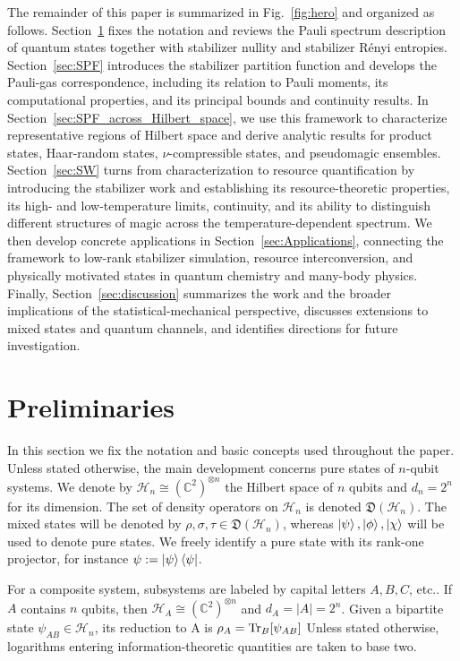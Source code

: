 \documentclass[aps,pra,superscriptaddress,twocolumn,longbibliography]{revtex4-2}
\newcommand{\tr}{{\rm Tr}}
\def\mH{\mathcal{H}}
\def\md{\mathfrak{D}}
\begin{document}
The remainder of this paper is summarized in Fig.~\ref{fig:hero} and organized as follows. 
Section~\ref{sec:preliminaries} fixes the notation and reviews the Pauli spectrum description of quantum states together with stabilizer nullity and stabilizer R\'enyi entropies. 
Section~\ref{sec:SPF} introduces the stabilizer partition function and develops the Pauli-gas correspondence, including its relation to Pauli moments, its computational properties, and its principal bounds and continuity results. 
In Section~\ref{sec:SPF_across_Hilbert_space}, we use this framework to characterize representative regions of Hilbert space and derive analytic results for product states, Haar-random states, $\nu$-compressible states, and pseudomagic ensembles. 
Section~\ref{sec:SW} turns from characterization to resource quantification by introducing the stabilizer work and establishing its resource-theoretic properties, its high- and low-temperature limits, continuity, and its ability to distinguish different structures of magic
across the temperature-dependent spectrum.
We then develop concrete applications in Section~\ref{sec:Applications}, connecting the framework to low-rank stabilizer simulation, resource interconversion, and physically motivated states in quantum chemistry and many-body physics. 
Finally, Section~\ref{sec:discussion} summarizes the work and the broader implications of the statistical-mechanical perspective, discusses extensions to mixed states and quantum channels, and identifies directions for future investigation.

\section{Preliminaries}\label{sec:preliminaries}

In this section we fix the notation and basic concepts used throughout the paper.
Unless stated otherwise, the main development concerns pure states of $n$-qubit systems.
We denote by $\mathcal{H}_{n}\cong (\mathbb{C}^{2})^{\otimes n}$ the Hilbert space of $n$ qubits and $d_n=2^n$ for its dimension.
The set of density operators on $\mH_n$ is denoted $\md(\mathcal{H}_{n})$.
The mixed states will be denoted by $\rho,\sigma,\tau \in \md(\mH_n)$, whereas $\ket{\psi},\ket{\phi},\ket{\chi}$ will be used to denote pure states.
We freely identify a pure state with its rank-one projector, for instance $\psi:=\ket{\psi}\bra{\psi}$.

For a composite system, subsystems are labeled by capital letters $A,B,C$, etc..
If $A$ contains $n$ qubits, then $\mathcal{H}_{A}\cong (\mathbb{C}^{2})^{\otimes n}$ and $d_{A}=|A|=2^n$.
Given a bipartite state $\psi_{AB}\in\mH_n$, its reduction to A is $\rho_A = \tr_B[\psi_{AB}]$
Unless stated otherwise, logarithms entering information-theoretic quantities are taken to base
two.
\end{document}
